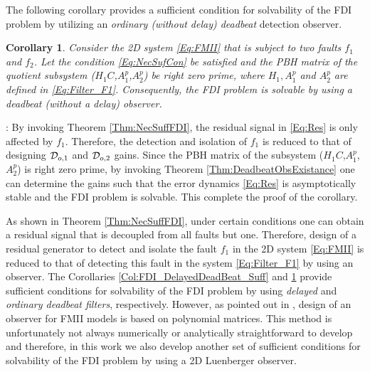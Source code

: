 \documentclass[journal,12pt,draftcls,onecolumn]{IEEEtran}
\def\QEDclosed{\hfill\IEEEQEDclosed}
\renewcommand{\qed}{\QEDclosed}
\renewenvironment{proof}[1][\proofname]{\noindent\nobreakspace{\bfseries #1}:\;}{\qed\par}
\newtheorem{corollary}{Corollary}
\begin{document}
The following corollary provides a sufficient condition for solvability of the FDI problem by utilizing  an {\it ordinary (without delay) deadbeat} detection observer.

\begin{corollary}\label{Col:FDI_DeadBeat_Suff}
	Consider the 2D system \eqref{Eq:FMII} that is subject to two faults $f_1$ and $f_2$. Let the condition \eqref{Eq:NecSufCon} be satisfied and the PBH matrix of the quotient subsystem ($H_1C$,$A_1^p$,$A_2^p$) be right zero prime, where $H_1,A_1^p$ and $A_2^p$ are defined in \eqref{Eq:Filter_F1}. Consequently, the FDI problem is solvable by using a deadbeat (without a delay) observer. \end{corollary}
\begin{proof}
	 By invoking Theorem \ref{Thm:NecSuffFDI},  the residual signal in \eqref{Eq:Res} is only affected by $f_1$. Therefore, the detection and isolation of $f_1$ is reduced to that of designing $\mathcal{D}_{o,1}$ and $\mathcal{D}_{o,2}$ gains.  Since the PBH matrix of the subsystem ($H_1C$,$A_1^p$,$A_2^p$) is right zero prime, by invoking Theorem \ref{Thm:DeadbeatObsExistance} one can determine the gains such that the error dynamics \eqref{Eq:Res} is asymptotically stable and the FDI problem is solvable. This complete the proof of the corollary.
\end{proof}

As shown in Theorem \ref{Thm:NecSuffFDI}, under certain conditions one can obtain a residual signal that is decoupled from all faults but one. Therefore, design of a residual generator to detect and isolate the fault $f_1$ in the 2D system \eqref{Eq:FMII} is reduced to that of detecting this fault in the system \eqref{Eq:Filter_F1} by using an observer. The Corollaries \ref{Col:FDI_DelayedDeadBeat_Suff} and \ref{Col:FDI_DeadBeat_Suff} provide sufficient conditions for solvability of the FDI problem by using \emph{delayed} and {\it ordinary deadbeat filters}, respectively. However, as pointed out in \cite{Bisiacco_Obs},  design of an observer for FMII models is based on polynomial matrices. This method is unfortunately not always numerically or analytically straightforward to develop and therefore, in this work we also develop another set of sufficient conditions for solvability of the FDI problem by using a 2D Luenberger observer.
\end{document}
